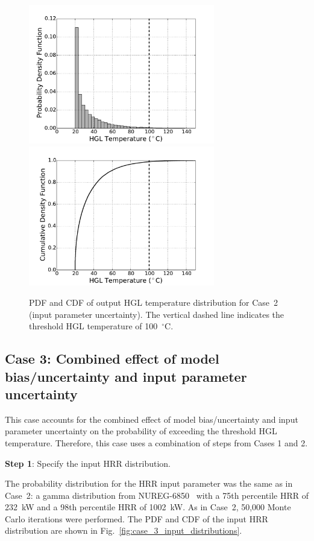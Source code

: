 \documentclass[12pt]{article}
\begin{document}
\begin{figure}[p]
\includegraphics[width=3.2in]{Figures/output_PDF_2_input}
\includegraphics[width=3.2in]{Figures/output_CDF_2_input}
\caption{PDF and CDF of output HGL temperature distribution for Case~2 (input parameter uncertainty). The vertical dashed line indicates the threshold HGL temperature of 100~$^\circ$C.}
\label{fig:case_2_output_distributions}
\end{figure}


\clearpage


\subsection{Case 3: Combined effect of model bias/uncertainty and input parameter uncertainty}

This case accounts for the combined effect of model bias/uncertainty and input parameter uncertainty on the probability of exceeding the threshold HGL temperature. Therefore, this case uses a combination of steps from Cases 1 and 2.

\textbf{Step 1}: Specify the input HRR distribution.

The probability distribution for the HRR input parameter was the same as in Case~2: a gamma distribution from NUREG-6850~\cite{NUREG_6850} with a 75th percentile HRR of 232~kW and a 98th percentile HRR of 1002~kW. As in Case~2, 50,000 Monte Carlo iterations were performed. The PDF and CDF of the input HRR distribution are shown in Fig.~\ref{fig:case_3_input_distributions}.
\end{document}
